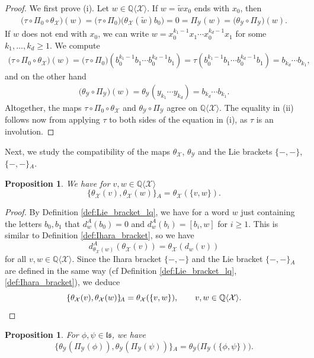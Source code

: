 \documentclass[12pt,reqno]{amsart}
\newtheorem{prop}[thm]{Proposition}
\numberwithin{equation}{section}
\theoremstyle{definition}
\newcommand{\QQ}{\mathbb{Q}}
\newcommand{\X}{\mathcal{X}}
\newcommand{\QX}{\QQ\langle \X\rangle}
\newcommand{\Y}{\mathcal{Y}}
\newcommand{\ls}{\mathfrak{ls}}
\newcommand{\ariemp}{\{-,-\}\!_A}
\newcommand{\ari}[2]{\{#1,#2\}\!_A}
\newcommand{\der}[1]{d_{#1}^A}
\newcommand{\pizero}{\Pi_0}
\newcommand{\piY}{\Pi_\Y}
\newcommand{\thetaX}{\theta_\X}
\newcommand{\thetaY}{\theta_\Y}
\begin{document}
\begin{proof} We first prove (i). Let $w\in \QX$. If $w=\widetilde{w}x_0$ ends with $x_0$, then
\begin{align*}
\big(\tau\circ \pizero\circ \thetaX\big)(w)=\big(\tau\circ \pizero\big)\big(\thetaX(\widetilde{w})b_0\big) =0 = \piY(w) =\big(\thetaY\circ \piY\big)(w).
\end{align*}
If $w$ does not end with $x_0$, we can write $w=x_0^{k_1-1}x_1\cdots x_0^{k_d-1}x_1$ for some $k_1,\ldots,k_d\geq1$. We compute
\begin{align*}
\big(\tau\circ \pizero\circ \thetaX\big)(w)=\big(\tau\circ \pizero\big)(b_0^{k_1-1}b_1\cdots b_0^{k_d-1}b_1)=\tau(b_0^{k_1-1}b_1\cdots b_0^{k_d-1}b_1)=b_{k_d}\cdots b_{k_1},
\end{align*}
and on the other hand
\begin{align*}
\big(\thetaY\circ\piY)(w)=\thetaY(y_{k_1}\cdots y_{k_d})=b_{k_d}\cdots b_{k_1}.
\end{align*}
Altogether, the maps $\tau\circ \pizero\circ \thetaX$ and $\thetaY\circ \piY$ agree on $\QX$. The equality in (ii) follows now from applying $\tau$ to both sides of the equation in (i), as $\tau$ is an involution.
\end{proof}

Next, we study the compatibility of the maps $\thetaX$, $\thetaY$ and the Lie brackets $\{-,-\}$, $\ariemp$.

\begin{prop} \label{prop:thetaX_Lie_bracks} We have for $v,w\in \QX$
\[ \ari{\thetaX(v)}{\thetaX(w)}=\thetaX(\{v,w\}).\]
\end{prop}

\begin{proof} By Definition \ref{def:Lie_bracket_lq}, we have for a word $w$ just containing the letters $b_0,b_1$ that $\der{w}(b_0)=0$ and $\der{w}(b_i)=[b_i,w]$ for $i\geq1$. This is similar to Definition \ref{def:Ihara_bracket}, so we have \[\der{\thetaX(w)}(\thetaX(v))=\thetaX(d_w(v))\] 
for all $v,w\in \QX$. Since the Ihara bracket $\{-,-\}$ and the Lie bracket $\ariemp$ are defined in the same way (cf Definition \ref{def:Lie_bracket_lq}, \ref{def:Ihara_bracket}), we deduce
\[\ari{\thetaX(v)}{\thetaX(w)}=\thetaX(\{v,w\}),\qquad v,w\in \QX. \qedhere\]
\end{proof}

\begin{prop}\label{prop:thetaY_Lie_bracks} For $\phi,\psi\in \ls$, we have
\[\ari{\thetaY(\piY(\phi))}{\thetaY(\piY(\psi))}=\thetaY\big(\piY(\{\phi,\psi\})\big).\]
\end{prop}
\end{document}
